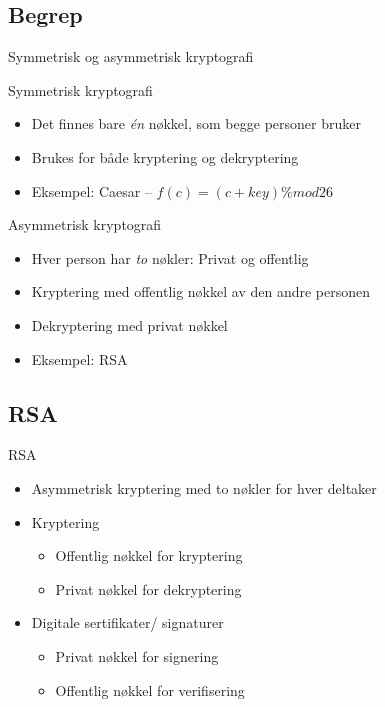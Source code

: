 \subsection*{Begrep}
\begin{frame}{Symmetrisk og asymmetrisk kryptografi}
\begin{block}{Symmetrisk kryptografi}
\begin{itemize}
\item Det finnes bare \textit{én} nøkkel, som begge personer bruker
\item Brukes for både kryptering og dekryptering
\item Eksempel: Caesar – $f(c) = (c+key) \% mod 26$
\end{itemize}
\end{block}
\begin{block}{Asymmetrisk kryptografi}
\begin{itemize}
\item Hver person har \textit{to} nøkler: Privat og offentlig
\item Kryptering med offentlig nøkkel av den andre personen
\item Dekryptering med privat nøkkel
\item Eksempel: RSA
\end{itemize}
\end{block}
\end{frame}

\subsection*{RSA}
\begin{frame}{RSA}
\begin{itemize}
\item Asymmetrisk kryptering med to nøkler for hver deltaker
\item Kryptering
	\begin{itemize}
	\item Offentlig nøkkel for kryptering
	\item Privat nøkkel for dekryptering
	\end{itemize}
\item Digitale sertifikater/ signaturer
	\begin{itemize}
	\item Privat nøkkel for signering
	\item Offentlig nøkkel for verifisering
	\end{itemize}
\end{itemize}
\end{frame}


